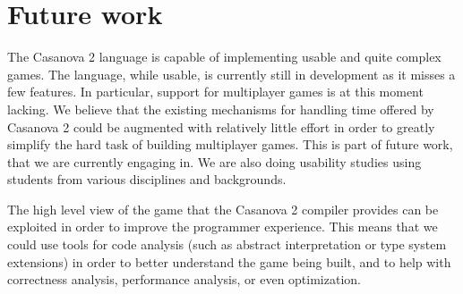 
\section{Future work}
\label{sec:future_work}
The Casanova 2 language is capable of implementing usable and quite complex games. The language, while usable, is currently still in development as it misses a few features. In particular, support for multiplayer games is at this moment lacking. We believe that the existing mechanisms for handling time offered by Casanova 2 could be augmented with relatively little effort in order to greatly simplify the hard task of building multiplayer games. This is part of future work, that we are currently engaging in. We are also doing usability studies using students from various disciplines and backgrounds.

The high level view of the game that the Casanova 2 compiler provides can be exploited in order to improve the programmer experience. This means that we could use tools for code analysis (such as abstract interpretation \cite{nielson1999principles} or type system extensions) in order to better understand the game being built, and to help with correctness analysis, performance analysis, or even optimization.







